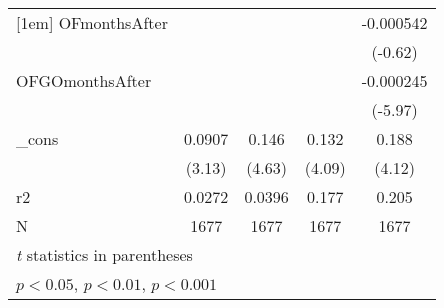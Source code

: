 \begin{table}[htbp]
\begin{tabular}{l*{4}{c}}
[1em]
OFmonthsAfter&                     &                     &                     &   -0.000542         \\
            &                     &                     &                     &     (-0.62)         \\
[1em]
OFGOmonthsAfter&                     &                     &                     &   -0.000245\sym{***}\\
            &                     &                     &                     &     (-5.97)         \\
[1em]
\_cons      &      0.0907\sym{**} &       0.146\sym{***}&       0.132\sym{***}&       0.188\sym{***}\\
            &      (3.13)         &      (4.63)         &      (4.09)         &      (4.12)         \\
\hline
r2          &      0.0272         &      0.0396         &       0.177         &       0.205         \\
N           &        1677         &        1677         &        1677         &        1677         \\
\hline\hline
\multicolumn{5}{l}{\footnotesize \textit{t} statistics in parentheses}\\
\multicolumn{5}{l}{\footnotesize \sym{*} \(p<0.05\), \sym{**} \(p<0.01\), \sym{***} \(p<0.001\)}\\
\end{tabular}
\end{table}
